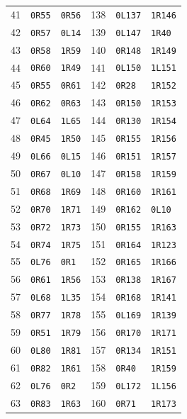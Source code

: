 \begin{longtable}{@{}rll@{\hspace{2em}}rll@{}}
41 & \texttt{0R55} & \texttt{0R56} & 138 & \texttt{0L137} & \texttt{1R146}\\
42 & \texttt{0R57} & \texttt{0L14} & 139 & \texttt{0L147} & \texttt{1R40}\\
43 & \texttt{0R58} & \texttt{1R59} & 140 & \texttt{0R148} & \texttt{1R149}\\
44 & \texttt{0R60} & \texttt{1R49} & 141 & \texttt{0L150} & \texttt{1L151}\\
45 & \texttt{0R55} & \texttt{0R61} & 142 & \texttt{0R28} & \texttt{1R152}\\
46 & \texttt{0R62} & \texttt{0R63} & 143 & \texttt{0R150} & \texttt{1R153}\\
47 & \texttt{0L64} & \texttt{1L65} & 144 & \texttt{0R130} & \texttt{1R154}\\
48 & \texttt{0R45} & \texttt{1R50} & 145 & \texttt{0R155} & \texttt{1R156}\\
49 & \texttt{0L66} & \texttt{0L15} & 146 & \texttt{0R151} & \texttt{1R157}\\
50 & \texttt{0R67} & \texttt{0L10} & 147 & \texttt{0R158} & \texttt{1R159}\\
51 & \texttt{0R68} & \texttt{1R69} & 148 & \texttt{0R160} & \texttt{1R161}\\
52 & \texttt{0R70} & \texttt{1R71} & 149 & \texttt{0R162} & \texttt{0L10}\\
53 & \texttt{0R72} & \texttt{1R73} & 150 & \texttt{0R155} & \texttt{1R163}\\
54 & \texttt{0R74} & \texttt{1R75} & 151 & \texttt{0R164} & \texttt{1R123}\\
55 & \texttt{0L76} & \texttt{0R1} & 152 & \texttt{0R165} & \texttt{1R166}\\
56 & \texttt{0R61} & \texttt{1R56} & 153 & \texttt{0R138} & \texttt{1R167}\\
57 & \texttt{0L68} & \texttt{1L35} & 154 & \texttt{0R168} & \texttt{1R141}\\
58 & \texttt{0R77} & \texttt{1R78} & 155 & \texttt{0L169} & \texttt{1R139}\\
59 & \texttt{0R51} & \texttt{1R79} & 156 & \texttt{0R170} & \texttt{1R171}\\
60 & \texttt{0L80} & \texttt{1R81} & 157 & \texttt{0R134} & \texttt{1R151}\\
61 & \texttt{0R82} & \texttt{1R61} & 158 & \texttt{0R40} & \texttt{1R159}\\
62 & \texttt{0L76} & \texttt{0R2} & 159 & \texttt{0L172} & \texttt{1L156}\\
63 & \texttt{0R83} & \texttt{1R63} & 160 & \texttt{0R71} & \texttt{1R173}\\

\end{longtable}
